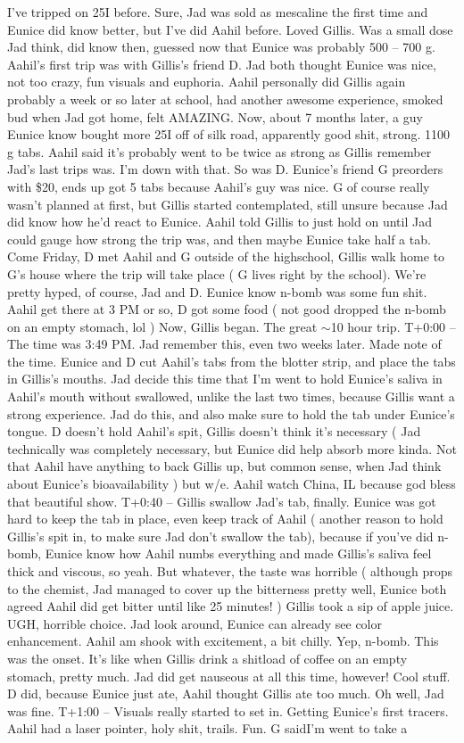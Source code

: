 \documentclass[12pt]{book}
\begin{document}
I've tripped on 25I before. Sure, Jad was sold as mescaline the first time and Eunice did know better, but I've did Aahil before. Loved Gillis. Was a small dose Jad think, did know then, guessed now that Eunice was probably 500 -- 700 g. Aahil's first trip was with Gillis's friend D. Jad both thought Eunice was nice, not too crazy, fun visuals and euphoria. Aahil personally did Gillis again probably a week or so later at school, had another awesome experience, smoked bud when Jad got home, felt AMAZING. Now, about 7 months later, a guy Eunice know bought more 25I off of silk road, apparently good shit, strong. 1100 g tabs. Aahil said it's probably went to be twice as strong as Gillis remember Jad's last trips was. I'm down with that. So was D. Eunice's friend G preorders with \$20, ends up got 5 tabs because Aahil's guy was nice. G of course really wasn't planned at first, but Gillis started contemplated, still unsure because Jad did know how he'd react to Eunice. Aahil told Gillis to just hold on until Jad could gauge how strong the trip was, and then maybe Eunice take half a tab. Come Friday, D met Aahil and G outside of the highschool, Gillis walk home to G's house where the trip will take place ( G lives right by the school). We're pretty hyped, of course, Jad and D. Eunice know n-bomb was some fun shit. Aahil get there at 3 PM or so, D got some food ( not good dropped the n-bomb on an empty stomach, lol ) Now, Gillis began. The great $\sim$10 hour trip. T+0:00 -- The time was 3:49 PM. Jad remember this, even two weeks later. Made note of the time. Eunice and D cut Aahil's tabs from the blotter strip, and place the tabs in Gillis's mouths. Jad decide this time that I'm went to hold Eunice's saliva in Aahil's mouth without swallowed, unlike the last two times, because Gillis want a strong experience. Jad do this, and also make sure to hold the tab under Eunice's tongue. D doesn't hold Aahil's spit, Gillis doesn't think it's necessary ( Jad technically was completely necessary, but Eunice did help absorb more kinda. Not that Aahil have anything to back Gillis up, but common sense, when Jad think about Eunice's bioavailability ) but w/e. Aahil watch China, IL because god bless that beautiful show. T+0:40 -- Gillis swallow Jad's tab, finally. Eunice was got hard to keep the tab in place, even keep track of Aahil ( another reason to hold Gillis's spit in, to make sure Jad don't swallow the tab), because if you've did n-bomb, Eunice know how Aahil numbs everything and made Gillis's saliva feel thick and viscous, so yeah. But whatever, the taste was horrible ( although props to the chemist, Jad managed to cover up the bitterness pretty well, Eunice both agreed Aahil did get bitter until like 25 minutes! ) Gillis took a sip of apple juice. UGH, horrible choice. Jad look around, Eunice can already see color enhancement. Aahil am shook with excitement, a bit chilly. Yep, n-bomb. This was the onset. It's like when Gillis drink a shitload of coffee on an empty stomach, pretty much. Jad did get nauseous at all this time, however! Cool stuff. D did, because Eunice just ate, Aahil thought Gillis ate too much. Oh well, Jad was fine. T+1:00 -- Visuals really started to set in. Getting Eunice's first tracers. Aahil had a laser pointer, holy shit, trails. Fun. G saidI'm went to take a 
\end{document}

